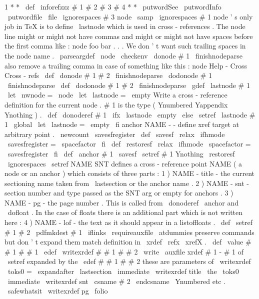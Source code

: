 {{{{{1
*
*
}
\
def
\
inforefzzz
#
1
#
2
#
3
#
4
*
*
{
%
\
putwordSee
{
}
\
putwordInfo
{
}
\
putwordfile
{
}
\
file
{
\
ignorespaces
#
3
{
}
}
node
\
samp
{
\
ignorespaces
#
1
{
}
}
}
%
node
'
s
only
job
in
TeX
is
to
define
\
lastnode
which
is
used
in
%
cross
-
references
.
The
node
line
might
or
might
not
have
commas
and
%
might
or
might
not
have
spaces
before
the
first
comma
like
:
%
node
foo
bar
.
.
.
%
We
don
'
t
want
such
trailing
spaces
in
the
node
name
.
%
\
parseargdef
\
node
{
\
checkenv
{
}
\
donode
#
1
\
finishnodeparse
}
%
%
also
remove
a
trailing
comma
in
case
of
something
like
this
:
%
node
Help
-
Cross
Cross
-
refs
\
def
\
donode
#
1
#
2
\
finishnodeparse
{
\
dodonode
#
1
\
finishnodeparse
}
\
def
\
dodonode
#
1
#
2
\
finishnodeparse
{
\
gdef
\
lastnode
{
#
1
}
}
\
let
\
nwnode
=
\
node
\
let
\
lastnode
=
\
empty
%
Write
a
cross
-
reference
definition
for
the
current
node
.
#
1
is
the
%
type
(
Ynumbered
Yappendix
Ynothing
)
.
%
\
def
\
donoderef
#
1
{
%
\
ifx
\
lastnode
\
empty
\
else
\
setref
{
\
lastnode
}
{
#
1
}
%
\
global
\
let
\
lastnode
=
\
empty
\
fi
}
%
anchor
{
NAME
}
-
-
define
xref
target
at
arbitrary
point
.
%
\
newcount
\
savesfregister
%
\
def
\
savesf
{
\
relax
\
ifhmode
\
savesfregister
=
\
spacefactor
\
fi
}
\
def
\
restoresf
{
\
relax
\
ifhmode
\
spacefactor
=
\
savesfregister
\
fi
}
\
def
\
anchor
#
1
{
\
savesf
\
setref
{
#
1
}
{
Ynothing
}
\
restoresf
\
ignorespaces
}
%
\
setref
{
NAME
}
{
SNT
}
defines
a
cross
-
reference
point
NAME
(
a
node
or
an
%
anchor
)
which
consists
of
three
parts
:
%
1
)
NAME
-
title
-
the
current
sectioning
name
taken
from
\
lastsection
%
or
the
anchor
name
.
%
2
)
NAME
-
snt
-
section
number
and
type
passed
as
the
SNT
arg
or
%
empty
for
anchors
.
%
3
)
NAME
-
pg
-
the
page
number
.
%
%
This
is
called
from
\
donoderef
\
anchor
and
\
dofloat
.
In
the
case
of
%
floats
there
is
an
additional
part
which
is
not
written
here
:
%
4
)
NAME
-
lof
-
the
text
as
it
should
appear
in
a
listoffloats
.
%
\
def
\
setref
#
1
#
2
{
%
\
pdfmkdest
{
#
1
}
%
\
iflinks
{
%
\
requireauxfile
\
atdummies
%
preserve
commands
but
don
'
t
expand
them
%
match
definition
in
\
xrdef
\
refx
\
xrefX
.
\
def
\
value
#
#
1
{
#
#
1
}
%
\
edef
\
writexrdef
#
#
1
#
#
2
{
%
\
write
\
auxfile
{
xrdef
{
#
1
-
%
#
1
of
\
setref
expanded
by
the
\
edef
#
#
1
}
{
#
#
2
}
}
%
these
are
parameters
of
\
writexrdef
}
%
\
toks0
=
\
expandafter
{
\
lastsection
}
%
\
immediate
\
writexrdef
{
title
}
{
\
the
\
toks0
}
%
\
immediate
\
writexrdef
{
snt
}
{
\
csname
#
2
\
endcsname
}
%
\
Ynumbered
etc
.
\
safewhatsit
{
\
writexrdef
{
pg
}
{
\
folio
}
}}}}}}}
